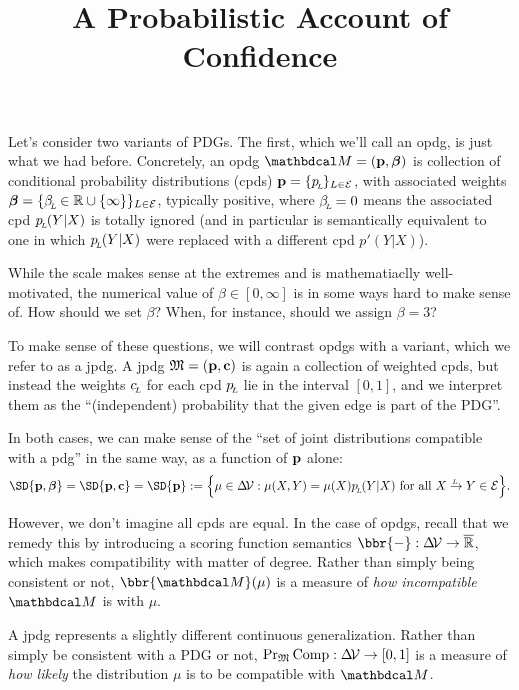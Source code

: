 \documentclass{article}
\title{A Probabilistic Account of Confidence}
\begin{document}
\maketitle

Let's consider two variants of PDGs. The first, which we'll call an opdg, is just what we had before. 
Concretely, an opdg $\dg M = (\mat p, \bbeta)$ is collection of conditional probability distributions (cpds) $\mathbf{p} = \{p_{\!_{L}\!} \}_{L \in \mathcal E}$, with associated weights $\boldsymbol\beta = \{\beta_{\!_{L}\!} \in \mathbb R \cup \{\infty\}\}_{L \in \mathcal E}$, typically positive, where $\beta_{\!_{L}\!}=0$ means the associated cpd $p_{\!_{L}\!}(Y|X)$ is totally ignored (and in particular is semantically equivalent to one in which $p_{\!_{L}\!}(Y|X)$ were replaced with a different cpd $p'(Y|X)$). 

While the scale makes sense at the extremes and is mathematiaclly well-motivated, the numerical value of $\beta \in [0,\infty]$ is in some ways hard to make sense of. 
How should we set $\beta$?  When, for instance, should we assign $\beta = 3$?

To make sense of these questions, we will contrast opdgs with a variant, which we refer to as a jpdg. A jpdg $\mathfrak M = (\mathbf{p}, \mathbf{c})$ is again a collection of weighted cpds, but instead the weights $c _{\!_{L}\!}$ for each cpd $p_{\!_{L}\!}$ lie in the interval $[0,1]$, and we interpret them as the ``(independent) probability that the given edge is part of the PDG''.

In both cases, we can make sense of the ``set of joint distributions compatible with a pdg'' in the same way, as a function of $\mathbf{p}$ alone: 
\[
    \SD{\mat p, \bbeta} = \SD{\mat p, \mat c} = \SD{\mat p} 
        := \Big\{ \mu \in \Delta\! \V : \mu(X,Y) = \mu(X)p\ssub L(Y|X) \text{ for all } 
            \ed LXY  \in \Ed \Big\}.
\]


However, we don't imagine all cpds are equal. 
In the case of opdgs, recall that we remedy this by introducing a scoring function semantics $\bbr{-} : \Delta\!\V \to \overline{\mathbb R}$, which makes compatibility with matter of degree. 
Rather than simply being consistent or not, $\bbr{\dg M}(\mu)$ is a measure of \emph{how incompatible} $\dg M$ is with $\mu$.

A jpdg represents a slightly different continuous generalization. 
Rather than simply be consistent with a PDG or not, $\Pr_{\mathfrak M}\mathrm{Comp}: \Delta\!\mathcal V \to [0,1]$ is a measure of \emph{how likely} the distribution $\mu$ is to be compatible with $\dg M$.
\end{document}
